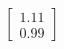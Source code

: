 \documentclass[preview]{standalone}
\begin{document}
\begin{align*}
\begin{bmatrix} 1.11 \\ 0.99 \end{bmatrix}
\end{align*}
\end{document}
